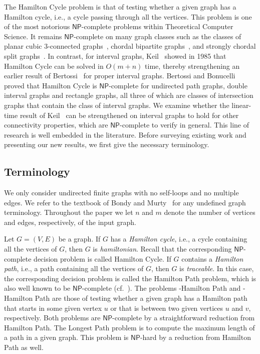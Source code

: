 \documentclass{llncs}
\newcommand{\NP}{{\mathsf{NP}}}
\begin{document}
The {\sc Hamilton Cycle} problem is that of 
testing whether a given graph has a Hamilton cycle, i.e., a cycle passing through all the vertices.
This problem
 is one of the most notorious $\NP$-complete problems within Theoretical Computer Science.
It remains $\NP$-complete on many graph classes such as the classes of planar cubic 3-connected graphs~\cite{GJT76},
chordal bipartite graphs~\cite{Mu96},  and strongly chordal split graphs~\cite{Mu96}. In contrast, for interval graphs, Keil~\cite{Ke85} showed in 1985 that {\sc Hamilton Cycle} can be solved in $O(m+n)$ time, thereby
strengthening an earlier result of Bertossi~\cite{Be83} for proper interval graphs.
Bertossi and Bonucelli~\cite{BB86} proved that {\sc Hamilton Cycle} is $\NP$-complete for undirected path graphs, double interval graphs and rectangle graphs, all three of which are classes of intersection graphs that contain the class of interval graphs.
We examine whether the linear-time result of Keil~\cite{Ke85}  can be strengthened on interval graphs to hold for other connectivity properties, which are $\NP$-complete to verify in general.
This line of research is well embedded in the literature. 
Before surveying existing work and presenting our new results, we first give the necessary terminology.

\subsection{Terminology}\label{s-term}

We only consider undirected finite graphs with no self-loops and no multiple edges. We refer to the textbook of Bondy and Murty~\cite{BM08} for any undefined graph terminology.
Throughout the paper we let $n$ and $m$ denote the number of vertices and edges, respectively, of the input graph.

Let $G=(V,E)$ be a graph. If $G$ has a {\em Hamilton cycle\/}, i.e., a cycle containing all the vertices of $G$, then $G$ is  {\em hamiltonian}.
Recall that the corresponding $\NP$-complete decision problem is called {\sc Hamilton Cycle}.
If $G$ contains a {\em Hamilton path}, i.e., a path containing all the vertices of $G$, then $G$ is  {\em traceable}. In this case, the corresponding decision problem is called the {\sc Hamilton Path} problem,
which is also well known to be $\NP$-complete (cf.~\cite{GJ79}).
The problems {-Hamilton Path} and {-Hamilton Path} are those of testing whether a given graph has a Hamilton path that starts in some given vertex $u$ or that is between two given vertices $u$ and $v$, respectively. Both problems are $\NP$-complete by a straightforward reduction from {\sc Hamilton Path}. The {\sc Longest Path} problem is to compute the maximum length
of a path in a given graph. This problem is $\NP$-hard by a reduction from {\sc Hamilton Path} as well.
\end{document}
